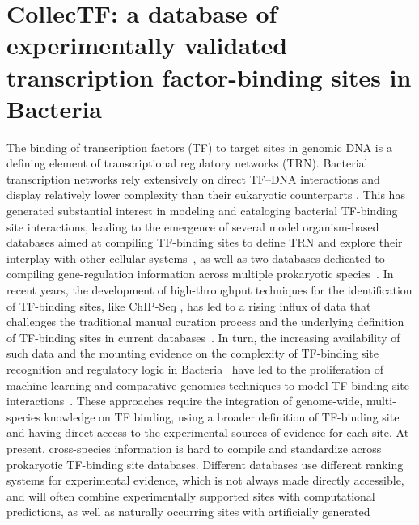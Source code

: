 
\chapter{CollecTF: a database of experimentally validated transcription
  factor-binding sites in Bacteria}

The binding of transcription factors (TF) to target sites in genomic DNA is a
defining element of transcriptional regulatory networks (TRN). Bacterial
transcription networks rely extensively on direct TF–DNA interactions and
display relatively lower complexity than their eukaryotic counterparts
\cite{wunderlich2009different, remenyi2004combinatorial}. This has generated
substantial interest in modeling and cataloging bacterial TF-binding site
interactions, leading to the emergence of several model organism-based
databases aimed at compiling TF-binding sites to define TRN and explore their
interplay with other cellular systems~\cite{salgado2013regulondb,
  jacques2005mtbreglist, pauling2012coryneregnet, sierro2008dbtbs}, as well as
two databases dedicated to compiling gene-regulation information across
multiple prokaryotic species~\cite{munch2005virtual,
  kazakov2007regtransbase}. In recent years, the development of high-throughput
techniques for the identification of TF-binding sites, like ChIP-Seq
\cite{mardis2007chip}, has led to a rising influx of data that challenges the
traditional manual curation process and the underlying definition of TF-binding
sites in current databases~\cite{salgado2013regulondb}. In turn, the increasing
availability of such data and the mounting evidence on the complexity of
TF-binding site recognition and regulatory logic in
Bacteria~\cite{hijum2009mechanisms, paul2007integration, barnard2004regulation}
have led to the proliferation of machine learning and comparative genomics
techniques to model TF-binding site interactions~\cite{narlikar2013mumod,
  maienschein2012improved, zwir2005dissecting}. These approaches require the
integration of genome-wide, multi-species knowledge on TF binding, using a
broader definition of TF-binding site and having direct access to the
experimental sources of evidence for each site. At present, cross-species
information is hard to compile and standardize across prokaryotic TF-binding
site databases. Different databases use different ranking systems for
experimental evidence, which is not always made directly accessible, and will
often combine experimentally supported sites with computational predictions, as
well as naturally occurring sites with artificially generated
